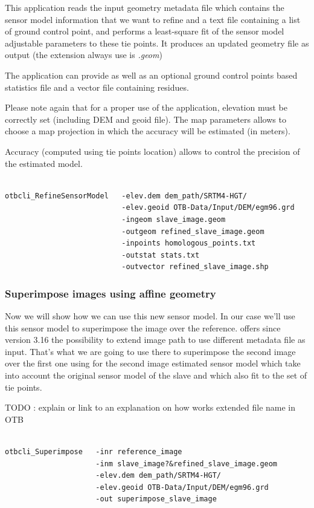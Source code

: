 This application reads the input geometry metadata file which contains the
sensor model information that we want to refine and a text file containing a
list of ground control point, and performs a least-square fit of the sensor
model adjustable parameters to these tie points. It produces an
updated geometry file as output (the extension always use is \textit{.geom})

The application can provide as well as an optional ground control points based
statistics file and a vector file containing residues.

Please note again that for a proper use of the application, elevation must be
correctly set (including DEM and geoid file). The map parameters allows to
choose a map projection in which the accuracy will be estimated (in meters).

Accuracy (computed using tie points location) allows to control the precision of
the estimated model.

\begin{verbatim}

otbcli_RefineSensorModel   -elev.dem dem_path/SRTM4-HGT/ 
                           -elev.geoid OTB-Data/Input/DEM/egm96.grd 
                           -ingeom slave_image.geom 
                           -outgeom refined_slave_image.geom 
                           -inpoints homologous_points.txt 
                           -outstat stats.txt 
                           -outvector refined_slave_image.shp

\end{verbatim}

\subsubsection{Superimpose images using affine geometry}

Now we will show how we can use this new sensor model. In our case we'll use
this sensor model to superimpose the image over the reference. \otb offers since
version 3.16 the possibility to extend image path to use different metadata file
as input. That's what we are going to use there to superimpose the second image
over the first one using for the second image estimated sensor model which take
into account the original sensor model of the slave and which also fit to the
set of tie points.

TODO : explain or link to an explanation on how works extended file name in OTB  

\begin{verbatim}

otbcli_Superimpose   -inr reference_image
                     -inm slave_image?&refined_slave_image.geom 
                     -elev.dem dem_path/SRTM4-HGT/ 
                     -elev.geoid OTB-Data/Input/DEM/egm96.grd 
                     -out superimpose_slave_image 

\end{verbatim}

